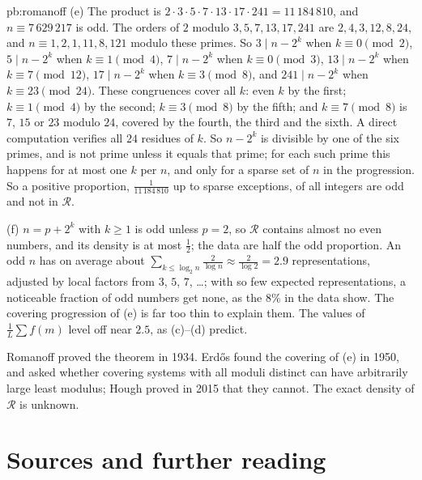 \begin{solution}{pb:romanoff}
(e) The product is $2\cdot3\cdot5\cdot7\cdot13\cdot17\cdot241=11\,184\,810$, and $n\equiv7\,629\,217$ is odd. The orders of $2$ modulo $3,5,7,13,17,241$ are $2,4,3,12,8,24$, and $n\equiv1,2,1,11,8,121$ modulo these primes. So $3\mid n-2^k$ when $k\equiv0\pmod2$,
$5\mid n-2^k$ when $k\equiv1\pmod4$, $7\mid n-2^k$ when $k\equiv0\pmod3$, $13\mid n-2^k$ when $k\equiv7\pmod{12}$, $17\mid n-2^k$ when $k\equiv3\pmod8$, and $241\mid n-2^k$ when
$k\equiv23\pmod{24}$. These congruences cover all $k$: even $k$ by the first; $k\equiv1\pmod4$ by the second; $k\equiv3\pmod8$ by the fifth; and $k\equiv7\pmod8$ is $7$, $15$ or $23$ modulo
$24$, covered by the fourth, the third and the sixth. A direct computation verifies all $24$ residues of $k$. So $n-2^k$ is
divisible by one of the six primes, and is not prime unless it equals that prime; for each such prime this happens for at most one $k$ per $n$, and only for a sparse set of $n$
in the progression. So a positive proportion, $\frac1{11\,184\,810}$ up to sparse exceptions, of all integers are odd and not in $\mathcal R$.

(f) $n=p+2^k$ with $k\ge1$ is odd unless $p=2$, so $\mathcal R$ contains almost no even numbers, and its density is at most $\frac12$; the data are half the odd proportion. An odd $n$
has on average about $\sum_{k\le\log_2n}\frac{2}{\log n}\approx\frac2{\log2}=2.9$ representations, adjusted by local factors from $3$, $5$, $7$, \dots; with so few expected
representations, a noticeable fraction of odd numbers get none, as the $8\%$ in the data show. The covering progression of (e) is far too thin to explain them. The values of
$\frac1L\sum f(m)$ level off near $2.5$, as (c)--(d) predict.


\leads Romanoff proved the theorem in 1934. Erd\H os found the covering of (e) in 1950, and asked whether covering systems with all moduli distinct can have arbitrarily large
least modulus; Hough proved in 2015 that they cannot. The exact density of $\mathcal R$ is unknown.
\end{solution}

\section*{Sources and further reading}

